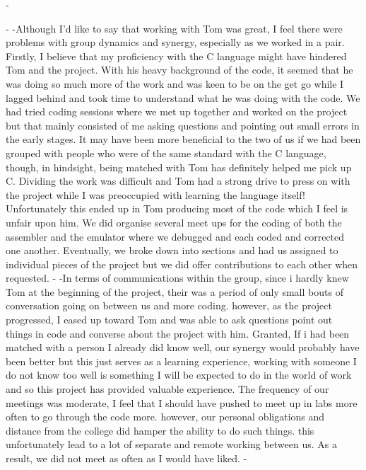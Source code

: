 -\documentclass[11pt]{article}
\begin{document}
-
-Although I'd like to say that working with Tom was great, I feel there were problems with group dynamics and synergy, especially as we worked in a pair. Firstly, I believe that my proficiency with the C language might have hindered Tom and the project. With his heavy background of the code, it seemed that he was doing so much more of the work and was keen to be on the get go while I lagged behind and took time to understand what he was doing with the code. We had tried coding sessions where we met up together and worked on the project but that mainly consisted of me asking questions and pointing out small errors in the early stages. It may have been more beneficial to the two of us if we had been grouped with people who were of the same standard with the C language, though, in hindsight, being matched with Tom has definitely helped me pick up C. Dividing the work was difficult and Tom had a strong drive to press on with the project while I was preoccupied with learning the language itself! Unfortunately this ended up in Tom producing most of the code which I feel is unfair upon him. We did organise several meet ups for the coding of both the assembler and the emulator where we debugged and each coded  and corrected one another. Eventually, we broke down into sections and had us assigned to individual pieces of the project but we did offer contributions to each other when requested.
-
-In terms of communications within the group, since i hardly knew Tom at the beginning of the project, their was a period of only small bouts of conversation going on between us and more coding. however, as the project progressed, I eased up toward Tom and was able to ask questions point out things in code and converse about the project with him. Granted, If i had been matched with a person I already did know well, our synergy would probably have been better but this just serves as a learning experience, working with someone I do not know too well is something I will be expected to do in the world of work and so this project has provided valuable experience. The frequency of our meetings was moderate, I feel that I should have pushed to meet up in labs more often to go through the code more. however, our personal obligations and distance from the college did hamper the ability to do such things. this unfortunately lead to a lot of separate and remote working between us. As a result, we did not meet as often as I would have liked.
-
\end{document}
